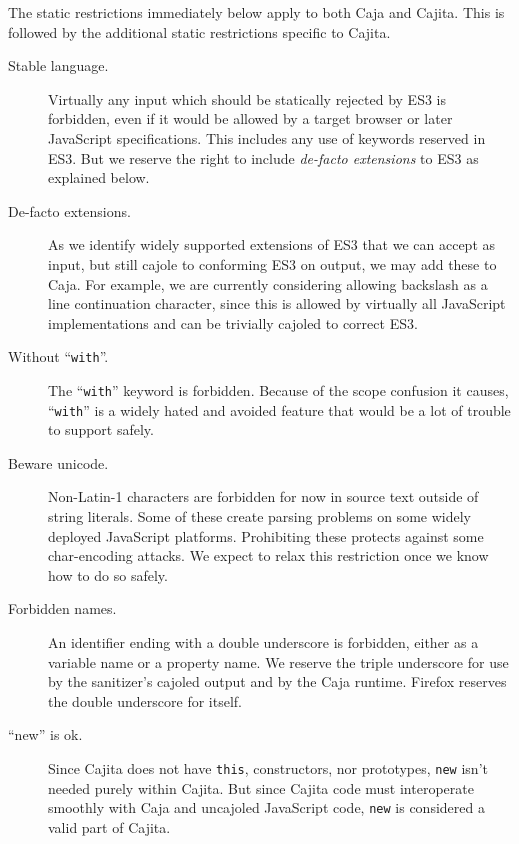 \documentclass[letterpaper,twocolumn,10pt]{article}
\newcommand{\code}[1]{{\tt {#1}}}              %
\begin{document}
The static restrictions immediately below apply to both Caja and Cajita. This 
is followed by the additional static restrictions specific to Cajita.

\begin{description}

    \item[Stable language.] Virtually any input which should be statically 
    rejected by ES3 is forbidden, even if it would be allowed by a target 
    browser or later JavaScript specifications. This includes any use of 
    keywords reserved in ES3. But we reserve the right to include 
    \emph{de-facto extensions} to ES3 as explained below.
    
    \item[De-facto extensions.] As we identify widely supported extensions of 
    ES3 that we can accept as input, but still cajole to conforming ES3 on 
    output, we may add these to Caja. For example, we are currently 
    considering allowing backslash as a line continuation character, since 
    this is allowed by virtually all JavaScript implementations and can be 
    trivially cajoled to correct ES3.

    \item[Without ``\code{with}''.] The ``\code{with}'' keyword is forbidden. 
    Because of the scope confusion it causes, ``\code{with}'' is a widely 
    hated and avoided feature that would be a lot of trouble to support 
    safely.

    \item[Beware unicode.] Non-Latin-1 characters are forbidden for now in 
    source text outside of string literals. Some of these create parsing 
    problems on some widely deployed JavaScript platforms. Prohibiting these 
    protects against some char-encoding attacks. We expect to relax this 
    restriction once we know how to do so safely.

    \item[Forbidden names.] An identifier ending with a double underscore is 
    forbidden, either as a variable name or a property name. We reserve the 
    triple underscore for use by the sanitizer's cajoled output and by the 
    Caja runtime. Firefox reserves the double underscore for itself.
    
    \item[``new'' is ok.] Since Cajita does not have \code{this}, 
    constructors, nor prototypes, \code{new} isn't needed purely within 
    Cajita. But since Cajita code must interoperate smoothly with Caja and 
    uncajoled JavaScript code, \code{new} is considered a valid part of 
    Cajita.
        
\end{description}
\end{document}
